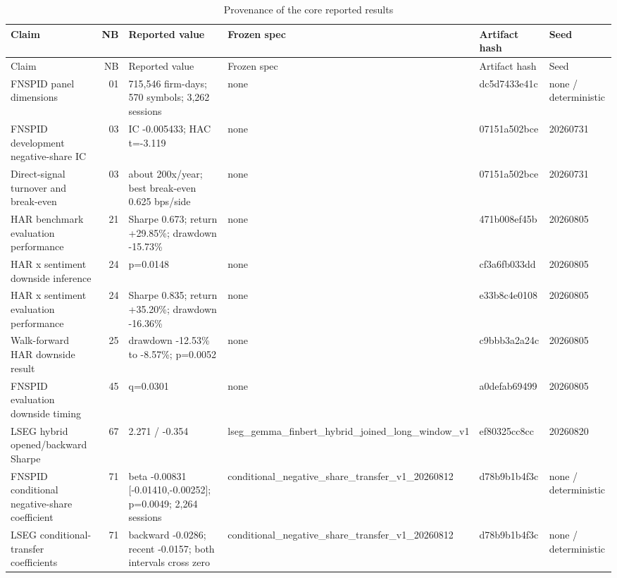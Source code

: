 \begingroup
\footnotesize
\begin{longtable}{p{3.1cm} r p{3.2cm} p{3.3cm} l p{1.8cm}}
\caption{Provenance of the core reported results}
\label{tab:core-result-provenance} \\
\toprule
Claim & NB & Reported value & Frozen spec & Artifact hash & Seed \\
\midrule
\endfirsthead
\toprule
Claim & NB & Reported value & Frozen spec & Artifact hash & Seed \\
\midrule
\endhead
FNSPID panel dimensions & 01 & 715,546 firm-days; 570 symbols; 3,262 sessions & none & dc5d7433e41c & none / deterministic \\
FNSPID development negative-share IC & 03 & IC -0.005433; HAC t=-3.119 & none & 07151a502bce & 20260731 \\
Direct-signal turnover and break-even & 03 & about 200x/year; best break-even 0.625 bps/side & none & 07151a502bce & 20260731 \\
HAR benchmark evaluation performance & 21 & Sharpe 0.673; return +29.85\%; drawdown -15.73\% & none & 471b008ef45b & 20260805 \\
HAR x sentiment downside inference & 24 & p=0.0148 & none & cf3a6fb033dd & 20260805 \\
HAR x sentiment evaluation performance & 24 & Sharpe 0.835; return +35.20\%; drawdown -16.36\% & none & e33b8c4e0108 & 20260805 \\
Walk-forward HAR downside result & 25 & drawdown -12.53\% to -8.57\%; p=0.0052 & none & c9bbb3a2a24c & 20260805 \\
FNSPID evaluation downside timing & 45 & q=0.0301 & none & a0defab69499 & 20260805 \\
LSEG hybrid opened/backward Sharpe & 67 & 2.271 / -0.354 & lseg\_\allowbreak{}gemma\_\allowbreak{}finbert\_\allowbreak{}hybrid\_\allowbreak{}joined\_\allowbreak{}long\_\allowbreak{}window\_\allowbreak{}v1 & ef80325cc8cc & 20260820 \\
FNSPID conditional negative-share coefficient & 71 & beta -0.00831 [-0.01410,-0.00252]; p=0.0049; 2,264 sessions & conditional\_\allowbreak{}negative\_\allowbreak{}share\_\allowbreak{}transfer\_\allowbreak{}v1\_\allowbreak{}20260812 & d78b9b1b4f3c & none / deterministic \\
LSEG conditional-transfer coefficients & 71 & backward -0.0286; recent -0.0157; both intervals cross zero & conditional\_\allowbreak{}negative\_\allowbreak{}share\_\allowbreak{}transfer\_\allowbreak{}v1\_\allowbreak{}20260812 & d78b9b1b4f3c & none / deterministic \\

\end{longtable}

